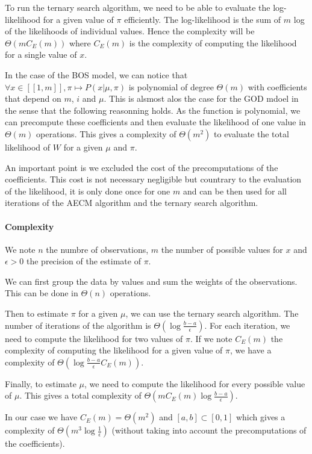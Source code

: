 To run the ternary search algorithm, we need to be able to evaluate the log-likelihood for a given value of $\pi$ efficiently.
The log-likelihood is the sum of $m$ log of the likelihoods of individual values.
Hence the complexity will be $\Theta(m C_E(m))$ where $C_E(m)$ is the complexity of computing the likelihood for a single value of $x$.

In the case of the BOS model, we can notice that $\forall x \in [[1, m]], \pi \mapsto P(x | \mu, \pi)$ is polynomial of degree $\Theta(m)$ with coefficients that depend on $m$, $i$ and $\mu$. This is alsmost alos the case for the GOD mdoel in the sense that the following reasonning holds. As the function is polynomial, we can precompute these coefficients and then evaluate the likelihood of one value in $\Theta(m)$ operations. This gives a complexity of $\Theta(m^2)$ to evaluate the total likelihood of $W$ for a given $\mu$ and $\pi$. 

An important point is we excluded the cost of the precomputations of the coefficients. This cost is not necessary negligible but countrary to the evaluation of the likelihood, it is only done once for one $m$ and can be then used for all iterations of the AECM algorithm and the ternary search algorithm.


\paragraph{Complexity}

We note $n$ the numbre of observations, $m$ the number of possible values for $x$ and $\epsilon > 0$ the precision of the estimate of $\pi$.

We can first group the data by values and sum the weights of the observations. This can be done in $\Theta(n)$ operations.

Then to estimate $\pi$ for a given $\mu$, we can use the ternary search algorithm. The number of iterations of the algorithm is $\Theta(\log \frac{b - a}{\epsilon})$. For each iteration, we need to compute the likelihood for two values of $\pi$. If we note $C_E(m)$ the complexity of computing the likelihood for a given value of $\pi$, we have a complexity of $\Theta(\log \frac{b - a}{\epsilon} C_E(m))$.

Finally, to estimate $\mu$, we need to compute the likelihood for every possible value of $\mu$. This gives a total complexity of $\Theta(m C_E(m) \log \frac{b - a}{\epsilon} )$.

In our case we have $C_E(m) = \Theta(m^2)$ and $[a, b] \subset [0, 1]$ which gives a complexity of $\Theta(m^3 \log \frac{1}{\epsilon})$ (without taking into account the precomputations of the coefficients).
